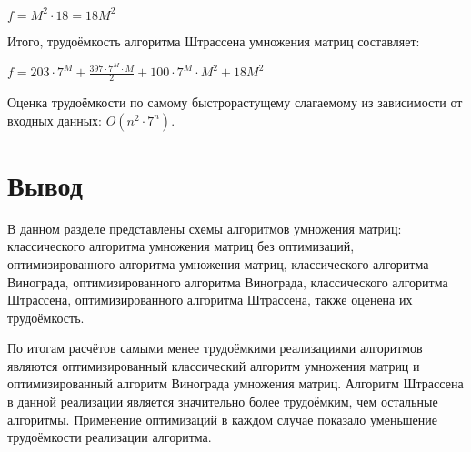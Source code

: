 $f = M^2 \cdot 18 = 18M^2$ 

Итого, трудоёмкость алгоритма Штрассена умножения матриц составляет:

$f = 203 \cdot 7^M + \frac{397 \cdot 7^M \cdot M}{2} + 100 \cdot 7^M \cdot M^2 + 18M^2$

Оценка трудоёмкости по самому быстрорастущему слагаемому из зависимости от входных данных: $O(n^2 \cdot 7^n)$.

\section*{Вывод}

В данном разделе представлены схемы алгоритмов умножения матриц: классического алгоритма умножения матриц без оптимизаций, оптимизированного алгоритма умножения матриц, классического алгоритма Винограда, оптимизированного алгоритма Винограда, классического алгоритма Штрассена, оптимизированного алгоритма Штрассена, также оценена их трудоёмкость.

По итогам расчётов самыми менее трудоёмкими реализациями алгоритмов являются оптимизированный классический алгоритм умножения матриц и оптимизированный алгоритм Винограда умножения матриц. Алгоритм Штрассена в данной реализации является значительно более трудоёмким, чем остальные алгоритмы. Применение оптимизаций в каждом случае показало уменьшение трудоёмкости реализации алгоритма.

